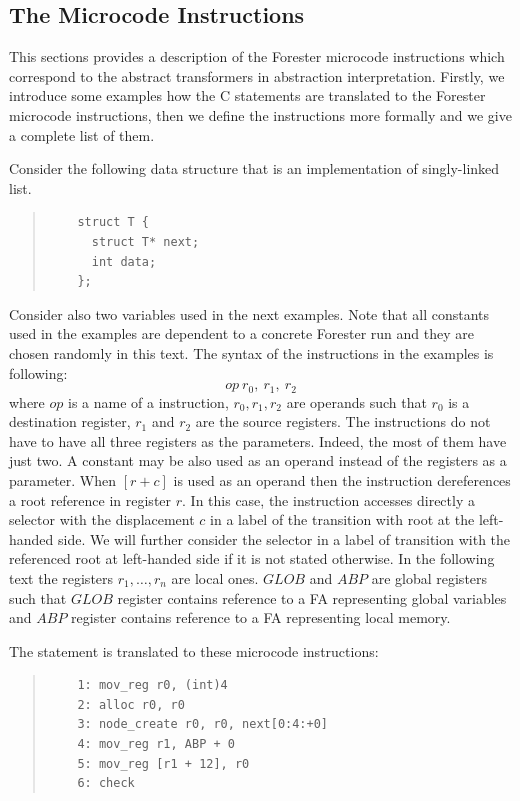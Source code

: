 \subsection{The Microcode Instructions}
\label{subsec:microinstr}

This sections provides a description of the Forester microcode instructions
which correspond to the abstract transformers in abstraction interpretation.
Firstly, we introduce some examples how the C statements are translated
to the Forester microcode instructions, then we define the instructions
more formally and we give a complete list of them.

Consider the following data structure that is an implementation of singly-linked list.
	\begin{quote}
	\begin{verbatim}
	struct T {
      struct T* next;
      int data;
	};

	\end{verbatim}
	\end{quote}
	
	Consider also two variables  used in the next examples.
	Note that all constants used in the examples are dependent to a concrete Forester
	run and they are chosen randomly in this text.
	The syntax of the instructions in the examples is following:
	$$ op\ r_0,\ r_1,\ r_2$$
	where $op$ is a name of a instruction,
	$r_0, r_1, r_2$ are operands such that $r_0$ is a destination register,
	$r_1$ and $r_2$ are the source registers.
	The instructions do not have to have all three registers as the parameters.
	Indeed, the most of them have just two.
	A constant may be also used as an operand instead of the registers as a parameter.
	When $[r+c]$ is used as an operand then the instruction dereferences a root reference in register $r$.
	In this case, the instruction accesses directly a selector with the displacement $c$ in a label of the transition with
	root at the left-handed side.
	We will further consider the selector in a label of transition with
	the referenced root at left-handed side if it is not stated otherwise.
	In the following text the registers $r_1,\ldots,r_n$ are local ones.
	$GLOB$ and $ABP$ are global registers such that $GLOB$ register contains reference to a FA representing
	global variables and $ABP$ register contains reference to a FA representing local memory.

\bexmp
	The statement  is translated
	to these microcode instructions:
	\begin{quote}
	\begin{verbatim}
	1: mov_reg r0, (int)4
	2: alloc r0, r0
	3: node_create r0, r0, next[0:4:+0]
	4: mov_reg r1, ABP + 0
	5: mov_reg [r1 + 12], r0    
	6: check
	\end{verbatim}
	\end{quote}

